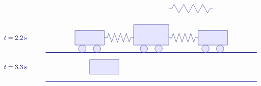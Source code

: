 \begin{solution}
\begin{itemize}
\begin{equation*}
\begin{tikzpicture}[scale=0.8, color=blue!50!black]
\begin{scope}[yshift=-2cm]
\begin{scope}[xshift=8.4cm]
            \draw (0,1) -- ++(0.2,0) -- ++(0.1625,0.3)
            -- ++(0.325,-0.6) -- ++(0.325,0.6)
            -- ++(0.325,-0.6) -- ++(0.325,0.6)
            -- ++(0.325,-0.6) -- ++(0.325,0.6)
            -- ++(0.325,-0.6) -- ++(0.1625,0.3)
            -- ++(0.2,0);
          \end{scope}
        \end{scope}
        \begin{scope}[yshift=-4cm]
          \draw (-3,1) node[right] {$t=2.2\s$};
          \draw[thick] (0,0) -- (14.4,0);
          \begin{scope}[xshift=0cm]
            \draw[fill=blue!10] (2,0.5) rectangle (4,1.5);
            \draw[fill=blue!10] (2.5,0.25) circle (0.25);
            \draw[fill=blue!10] (3.5,0.25) circle (0.25);
          \end{scope}
          \begin{scope}[xshift=4.2cm]
            \draw[fill=blue!10] (1.8,0.5) rectangle (4.2,1.9);
            \draw[fill=blue!10] (2.5,0.25) circle (0.25);
            \draw[fill=blue!10] (3.5,0.25) circle (0.25);
          \end{scope}
          \begin{scope}[xshift=8.4cm]
            \draw[fill=blue!10] (2,0.5) rectangle (4,1.5);
            \draw[fill=blue!10] (2.5,0.25) circle (0.25);
            \draw[fill=blue!10] (3.5,0.25) circle (0.25);
          \end{scope}
          \begin{scope}[xshift=4cm]
            \draw (0,1) -- ++(0.2,0) -- ++(0.1,0.3)
            -- ++(0.2,-0.6) -- ++(0.2,0.6)
            -- ++(0.2,-0.6) -- ++(0.2,0.6)
            -- ++(0.2,-0.6) -- ++(0.2,0.6)
            -- ++(0.2,-0.6) -- ++(0.1,0.3)
            -- ++(0.2,0);
          \end{scope}
          \begin{scope}[xshift=8.4cm]
            \draw (0,1) -- ++(0.2,0) -- ++(0.1,0.3)
            -- ++(0.2,-0.6) -- ++(0.2,0.6)
            -- ++(0.2,-0.6) -- ++(0.2,0.6)
            -- ++(0.2,-0.6) -- ++(0.2,0.6)
            -- ++(0.2,-0.6) -- ++(0.1,0.3)
            -- ++(0.2,0);
          \end{scope}
        \end{scope}
        \begin{scope}[yshift=-6cm]
          \draw (-3,1) node[right] {$t=3.3\s$};
          \draw[thick] (0,0) -- (14.4,0);
          \begin{scope}[xshift=1cm]
            \draw[fill=blue!10] (2,0.5) rectangle (4,1.5);

\end{scope}
\end{scope}
\end{tikzpicture}
\end{equation*}
\end{itemize}
\end{solution}
